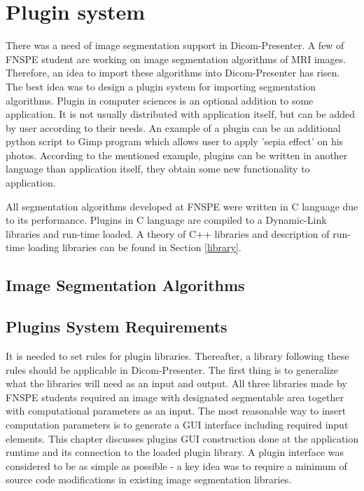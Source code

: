 \chapter{Plugin system}
\vspace{-10mm}

There was a need of image segmentation support in Dicom-Presenter. A few of FNSPE student are working on image segmentation algorithms of MRI images. Therefore, an idea to import these algorithms into Dicom-Presenter has risen. The best idea was to design a plugin system for importing segmentation algorithms.
Plugin in computer sciences is an optional addition to some application. It is not usually distributed with application itself, but can be added by user according to their needs. An example of a plugin can be an additional python script to Gimp program which allows user to apply 'sepia effect' on his photos. According to the mentioned example, plugins can be written in another language than application itself, they obtain some new functionality to application.


All segmentation algorithms developed at FNSPE were written in C language due to its performance. Plugins in C language are compiled to a Dynamic-Link libraries and run-time loaded. A theory of C++ libraries and description of run-time loading libraries can be found in Section \ref{library}.

\section{Image Segmentation Algorithms}


\section{Plugins System Requirements}

It is needed to set rules for plugin libraries. Thereafter, a library following these rules should be applicable in Dicom-Presenter. The first thing is to generalize what the libraries will need as an input and output. All three libraries made by FNSPE students required an image with designated segmentable area together with computational parameters as an input. The most reasonable way to insert computation parameters is to generate a GUI interface including required input elements. This chapter discusses plugins GUI construction done at the application runtime and its connection to the loaded plugin library. A plugin interface was considered to be as simple as possible - a key idea was to require a minimum of source code modifications in existing image segmentation libraries.

